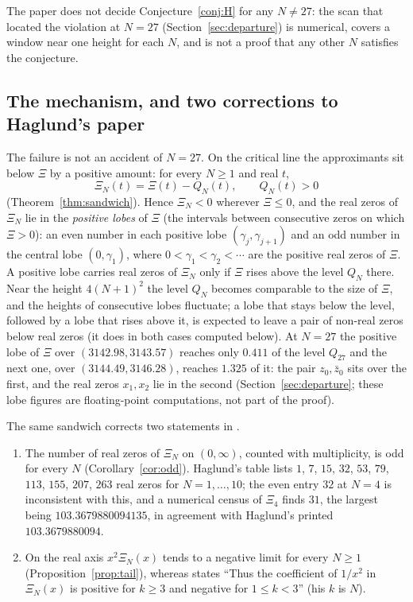 \documentclass[11pt]{article}
\theoremstyle{plain}
\theoremstyle{definition}
\theoremstyle{remark}
\begin{document}
The paper does not decide Conjecture~\ref{conj:H} for any $N \ne 27$: the scan
that located the violation at $N = 27$ (Section~\ref{sec:departure}) is
numerical, covers a window near one height for each $N$, and is not a proof that
any other $N$ satisfies the conjecture.

\subsection{The mechanism, and two corrections to Haglund's paper}\label{sec:mech}

The failure is not an accident of $N = 27$. On the critical line the approximants
sit below $\Xi$ by a positive amount: for every $N \ge 1$ and real $t$,
\[
\Xi_N(t) = \Xi(t) - Q_N(t), \qquad Q_N(t) > 0
\]
(Theorem~\ref{thm:sandwich}). Hence $\Xi_N < 0$ wherever $\Xi \le 0$, and the real
zeros of $\Xi_N$ lie in the \emph{positive lobes} of $\Xi$ (the intervals between
consecutive zeros on which $\Xi > 0$): an even number in each positive lobe
$(\gamma_j, \gamma_{j+1})$ and an odd number in the central lobe $(0, \gamma_1)$,
where $0 < \gamma_1 < \gamma_2 < \cdots$ are the positive real zeros of $\Xi$. A
positive lobe carries real zeros of $\Xi_N$ only if $\Xi$ rises above the level $Q_N$ there. Near the height $4(N+1)^2$ the
level $Q_N$ becomes comparable to the size of $\Xi$, and the heights of
consecutive lobes fluctuate; a lobe that stays below the level, followed by a
lobe that rises above it, is expected to leave a pair of non-real zeros below real
zeros (it does in both cases computed below). At
$N = 27$ the positive lobe of $\Xi$ over $(3142.98, 3143.57)$ reaches only
$0.411$ of the level $Q_{27}$ and the next one, over $(3144.49, 3146.28)$,
reaches $1.325$ of it: the pair $z_0, \bar z_0$ sits over the first, and the real
zeros $x_1, x_2$ lie in the second (Section~\ref{sec:departure}; these lobe
figures are floating-point computations, not part of the proof).

The same sandwich corrects two statements in \cite{Hag}.
\begin{enumerate}
\item[(i)] The number of real zeros of $\Xi_N$ on $(0,\infty)$, counted with
multiplicity, is odd for every $N$ (Corollary~\ref{cor:odd}). Haglund's table
\cite[p.~4]{Hag} lists $1$, $7$, $15$, $32$, $53$, $79$, $113$, $155$, $207$, $263$ real zeros for
$N = 1, \ldots, 10$; the even entry $32$ at $N = 4$ is inconsistent with this,
and a numerical census of $\Xi_4$ finds $31$, the largest being
$103.3679880094135$, in agreement with Haglund's printed $103.3679880094$.
\item[(ii)] On the real axis $x^2\Xi_N(x)$ tends to a negative limit for every
$N \ge 1$ (Proposition~\ref{prop:tail}), whereas \cite[p.~10]{Hag} states
``Thus the coefficient of $1/x^2$ in $\Xi_N(x)$ is positive for $k \ge 3$ and
negative for $1 \le k < 3$'' (his $k$ is $N$).
\end{enumerate}
\end{document}
